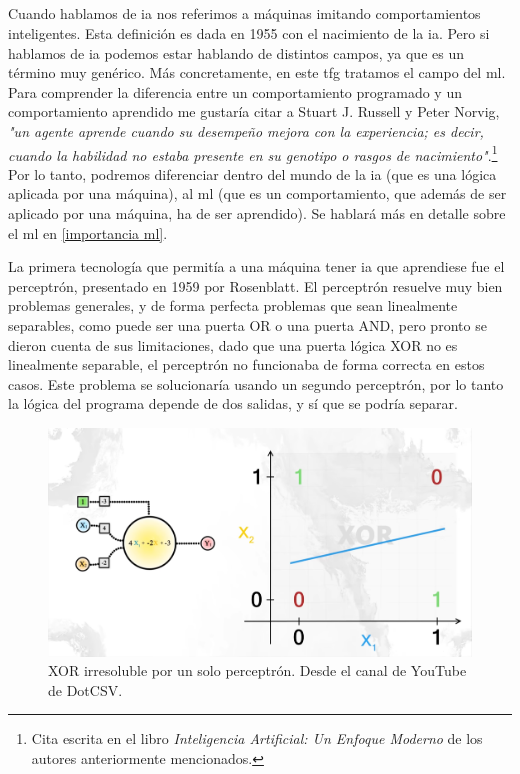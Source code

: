 \subsection{}
Cuando hablamos de \gls{ia} nos referimos a máquinas imitando comportamientos inteligentes. Esta definición es dada en 1955 con el nacimiento de la \gls{ia}. Pero si hablamos de \gls{ia} podemos estar hablando de distintos campos, ya que es un término muy genérico. Más concretamente, en este \gls{tfg} tratamos el campo del \gls{ml}.
\\
Para comprender la diferencia entre un comportamiento programado y un comportamiento aprendido me gustaría citar a Stuart J. Russell y Peter Norvig, \textit{"un agente aprende cuando su desempeño mejora con la experiencia; es decir, cuando la habilidad no estaba presente en su genotipo o rasgos de nacimiento"}.\footnote{Cita escrita en el libro \textit{Inteligencia Artificial: Un Enfoque Moderno} de los autores anteriormente mencionados.} Por lo tanto, podremos diferenciar dentro del mundo de la \gls{ia} (que es una lógica aplicada por una máquina), al \gls{ml} (que es un comportamiento, que además de ser aplicado por una máquina, ha de ser aprendido). Se hablará más en detalle sobre el \gls{ml} en \ref{importancia ml}.

La primera tecnología que permitía a una máquina tener \gls{ia} que aprendiese fue el perceptrón, presentado en 1959 por Rosenblatt. El perceptrón resuelve muy bien problemas generales, y de forma perfecta problemas que sean linealmente separables, como puede ser una puerta OR o una puerta AND, pero pronto se dieron cuenta de sus limitaciones, dado que una puerta lógica XOR no es linealmente separable, el perceptrón no funcionaba de forma correcta en estos casos. Este problema se solucionaría usando un segundo perceptrón, por lo tanto la lógica del programa depende de dos salidas, y sí que se podría separar.
\begin{figure}[h]
	\centering
	\includegraphics[width=15cm]{archivos/imagenes/problema-xor.png}
	\caption{XOR irresoluble por un solo perceptrón. Desde el canal de YouTube de DotCSV.}
	\label{XOR con un perceptron}
\end{figure}

